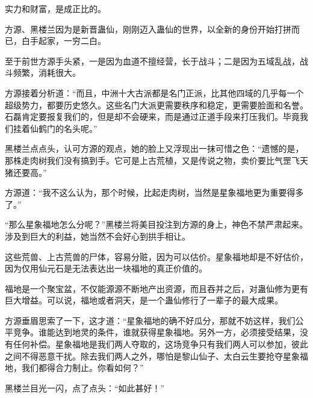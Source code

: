 \begin{this_body}
实力和财富，是成正比的。

方源、黑楼兰因为是新晋蛊仙，刚刚迈入蛊仙的世界，以全新的身份开始打拼而已，白手起家，一穷二白。

至于前世方源手头紧，一是因为血道不擅经营，长于战斗；二是因为五域乱战，战斗频繁，消耗很大。

方源接着分析道：“而且，中洲十大古派都是名门正派，比其他四域的几乎每一个超级势力，都要历史悠久。这些名门大派更需要秩序和稳定，更需要脸面和名誉。石磊肯定要报复我们的，但是却不会硬来，而是通过正道手段来打压我们。毕竟我们挂着仙鹤门的名头呢。”

黑楼兰点点头，认可方源的观点，她的脸上又浮现出一抹可惜之色：“遗憾的是，那株走肉树我们没有搞到手。它可是上古荒植，又是传说之物，卖价要比气罡飞天猪还要高。”

方源道：“我不这么认为，那个时候，比起走肉树，当然是星象福地更为重要得多了。”

“那么星象福地怎么分呢？”黑楼兰将美目投注到方源的身上，神色不禁严肃起来。涉及到巨大的利益，她当然不会好心到拱手相让。

这些荒兽、上古荒兽的尸体，容易分赃，因为可以估价。星象福地却是不好估价，因为仅用仙元石是无法表达出一块福地的真正价值的。

福地是一个聚宝盆，不仅能源源不断地产出资源，而且吞并之后，对蛊仙修为更有巨大增益。可以说，福地或者洞天，是一个蛊仙修行了一辈子的最大成果。

方源垂眉思索了一下，这才道：“星象福地的确不好瓜分，那就不妨这样，我们公平竞争。谁能达到地灵的条件，谁就获得星象福地。另外一方，必须接受结果，没有任何补偿。星象福地是我们两人夺取的，这场竞争只有我们两人可以参加，彼此之间不得恶意干扰。除去我们两人之外，哪怕是黎山仙子、太白云生要抢夺星象福地，我们都得合力制止。你看如何？”

黑楼兰目光一闪，点了点头：“如此甚好！”

\end{this_body}

